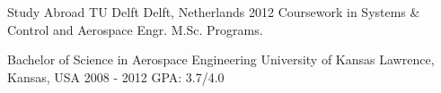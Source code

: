 \begin{cventries}
  \cveduentry
    {Study Abroad} %
    {TU Delft} %
    {Delft, Netherlands} %
    {2012} %
    {Coursework in Systems \& Control and Aerospace Engr. M.Sc. Programs.}
    
  \cveduentry
    {Bachelor of Science in Aerospace Engineering} %
    {University of Kansas} %
    {Lawrence, Kansas, USA} %
    {2008 - 2012} %
    {GPA: 3.7/4.0}
\end{cventries}
